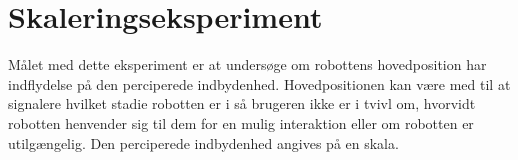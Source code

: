 \chapter*{Skaleringseksperiment}
%
Målet med dette eksperiment er at undersøge om robottens hovedposition har indflydelse på den perciperede indbydenhed. Hovedpositionen kan være med til at signalere hvilket stadie robotten er i så brugeren ikke er i tvivl om, hvorvidt robotten henvender sig til dem for en mulig interaktion eller om robotten er utilgængelig. Den perciperede indbydenhed angives på en skala.      
%